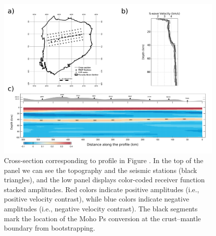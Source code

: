 \documentclass[paper,11pt]{geophysics}
\begin{document}
\begin{figure}[!ht]
\centering
\includegraphics[width=\textwidth]{Fig/section_migration.png}
\caption{Cross-section corresponding to profile in Figure . In the top of the panel we can see the topography and the seismic stations (black triangles), and the low panel displays color-coded receiver function stacked amplitudes. Red colors indicate positive amplitudes (i.e., positive velocity contrast), while blue colors indicate negative amplitudes (i.e., negative velocity contrast). The black segments mark the location of the Moho Ps conversion at the crust–mantle boundary from bootstrapping.}
\label{moisaic_migration}
\end{figure}
\end{document}
